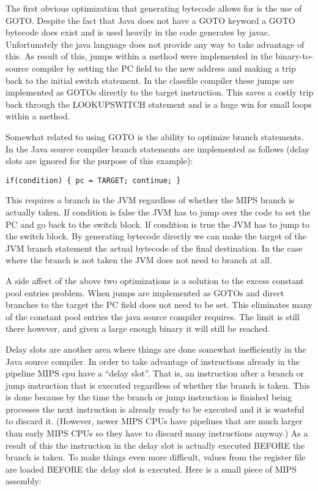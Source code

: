 \documentclass{acmconf}
\begin{document}
The first obvious optimization that generating bytecode allows for is the
use of GOTO. Despite the fact that Java does not have a GOTO keyword a GOTO
bytecode does exist and is used heavily in the code generates by javac.
Unfortunately the java language does not provide any way to take advantage of
this. As result of this, jumps within a method were implemented in the
binary-to-source compiler by setting the PC field to the new address and
making a trip back to the initial switch statement.  In the classfile
compiler these jumps are implemented as GOTOs directly to the target
instruction. This saves a costly trip back through the LOOKUPSWITCH
statement and is a huge win for small loops within a method.

Somewhat related to using GOTO is the ability to optimize branch
statements. In the Java source compiler branch statements are
implemented as follows (delay slots are ignored for the purpose of
this example):

{\footnotesize\begin{verbatim}
if(condition) { pc = TARGET; continue; }
\end{verbatim}}

This requires a branch in the JVM regardless of whether the MIPS
branch is actually taken. If condition is false the JVM has to jump
over the code to set the PC and go back to the switch block. If
condition is true the JVM has to jump to the switch block. By
generating bytecode directly we can make the target of the JVM branch
statement the actual bytecode of the final destination. In the case
where the branch is not taken the JVM does not need to branch at all.

A side affect of the above two optimizations is a solution to the
excess constant pool entries problem. When jumps are implemented as
GOTOs and direct branches to the target the PC field does not need to
be set. This eliminates many of the constant pool entries the java
source compiler requires. The limit is still there however, and given
a large enough binary it will still be reached.

Delay slots are another area where things are done somewhat
inefficiently in the Java source compiler. In order to take advantage
of instructions already in the pipeline MIPS cpu have a ``delay
slot''. That is, an instruction after a branch or jump instruction that
is executed regardless of whether the branch is taken. This is done
because by the time the branch or jump instruction is finished being
processes the next instruction is already ready to be executed and it
is wasteful to discard it. (However, newer MIPS CPUs have pipelines
that are much larger than early MIPS CPUs so they have to discard many
instructions anyway.) As a result of this the instruction in the delay
slot is actually executed BEFORE the branch is taken. To make things
even more difficult, values from the register file are loaded BEFORE
the delay slot is executed.  Here is a small piece of MIPS assembly:
\end{document}
